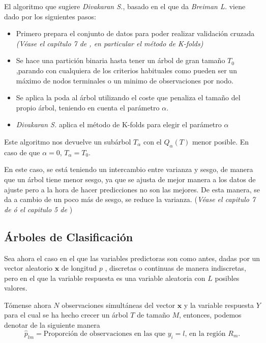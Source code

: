 \noindent El algoritmo que sugiere \emph{Divakaran S.}\cite{Divakaran 2022}, basado en el que da \emph{Breiman L.}\cite{Breiman 1984} viene dado por los siguientes pasos:
\begin{itemize}
\item Primero prepara el conjunto de datos para poder realizar validación cruzada \emph{(Véase el capítulo 7 de \cite{Hastie 2001}, en particular el método de K-folds)}
\item Se hace una partición binaria hasta tener un árbol de gran tamaño $T_0$,parando con cualquiera de los criterios habituales como pueden ser un máximo de nodos terminales o un minimo de observaciones por nodo. 

\item Se aplica la poda al árbol utilizando el coste que penaliza el tamaño del propio árbol, teniendo en cuenta el parámetro $\alpha$. 

\item \emph{Divakaran S.}\cite{Divakaran 2022} aplica el método de K-folds para elegir el parámetro $\alpha$
\end{itemize}

\noindent Este algoritmo nos devuelve un subárbol $T_{\alpha}$ con el $Q_{\alpha}(T)$ menor posible. En caso de que $\alpha=0$, $T_{\alpha}=T_0$.

\noindent En este caso, se está teniendo un intercambio entre varianza y sesgo, de manera que un árbol tiene menor sesgo, ya que se ajusta de mejor manera a los datos de ajuste pero a la hora de hacer predicciones no son las mejores. De esta manera, se da a cambio de un poco más de sesgo, se reduce la varianza. (\emph{Véase el capitulo 7 de \cite{Hastie 2001} ó el capitulo 5 de \cite{James 2013} })

\noindent 



\subsection{Árboles de Clasificación}

\noindent Sea ahora el caso en el que las variables predictoras son como antes, dadas por un vector aleatorio $\mathbf{x}$ de longitud $p$ , discretas o continuas de manera indiscretas, pero en el que la variable respuesta es una variable aleatoria con $L$ posibles valores.

\noindent Tómense ahora $N$ observaciones simultáneas del vector $\mathbf{x}$ y la variable respuesta $Y$ para el cual se ha hecho crecer un árbol $T$ de tamaño $M$, entonces, podemos denotar de la siguiente manera \cite{Divakaran 2022, Brown 2004}
\begin{equation}
\hat{p}_{lm}=\text{Proporción de observaciones en las que $y_i=l$, en la región $R_m$.}
\end{equation}

